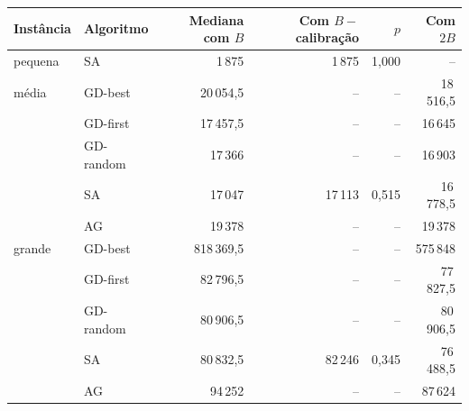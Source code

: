 \begin{tabular}{llrrrr}
\toprule
Instância & Algoritmo & Mediana com $B$ & Com $B - $ calibração & $p$ & Com $2B$ \\
\midrule
pequena & SA & 1\,875 & 1\,875 & 1,000 & -- \\
\midrule
média & GD-best & 20\,054,5 & -- & -- & 18\,516,5 \\
 & GD-first & 17\,457,5 & -- & -- & 16\,645 \\
 & GD-random & 17\,366 & -- & -- & 16\,903 \\
 & SA & 17\,047 & 17\,113 & 0,515 & 16\,778,5 \\
 & AG & 19\,378 & -- & -- & 19\,378 \\
\midrule
grande & GD-best & 818\,369,5 & -- & -- & 575\,848 \\
 & GD-first & 82\,796,5 & -- & -- & 77\,827,5 \\
 & GD-random & 80\,906,5 & -- & -- & 80\,906,5 \\
 & SA & 80\,832,5 & 82\,246 & 0,345 & 76\,488,5 \\
 & AG & 94\,252 & -- & -- & 87\,624 \\
\bottomrule
\end{tabular}
